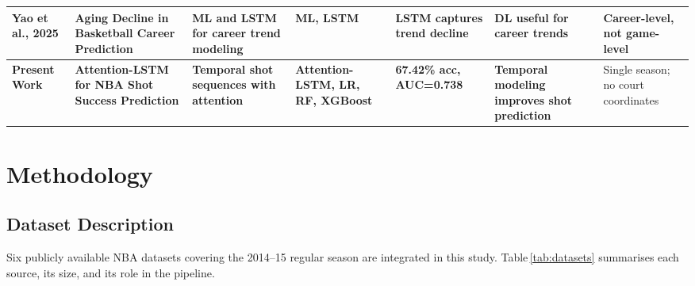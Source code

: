 \documentclass[conference]{IEEEtran}
\begin{document}
\begin{table}[!t]
\begin{tabular}{|p{1.6cm}|p{3.5cm}|p{3.2cm}|p{1.8cm}|p{2.6cm}|p{2.4cm}|p{2.4cm}|}
Yao et al., 2025 \cite{b9} &
Aging Decline in Basketball Career Prediction &
ML and LSTM for career trend modeling &
ML, LSTM &
LSTM captures trend decline &
DL useful for career trends &
Career-level, not game-level \\ \hline

\textbf{Present Work} &
\textbf{Attention-LSTM for NBA Shot Success Prediction} &
\textbf{Temporal shot sequences with attention} &
\textbf{Attention-LSTM, LR, RF, XGBoost} &
\textbf{67.42\% acc, AUC=0.738} &
\textbf{Temporal modeling improves shot prediction} &
Single season; no court coordinates \\ \hline
\end{tabular}
\vspace{0.1cm}
\end{table}

\section{Methodology}

\subsection{Dataset Description}

Six publicly available NBA datasets covering the 2014--15 regular season
are integrated in this study.  Table\,\ref{tab:datasets} summarises each
source, its size, and its role in the pipeline.

\begin{table}[H]
\centering
\caption{Dataset Description}
\label{tab:datasets}
\renewcommand{\arraystretch}{1.5}
\setlength{\tabcolsep}{2pt}
\scriptsize
{}
\vspace{0.1cm}
\end{table}
\end{document}
